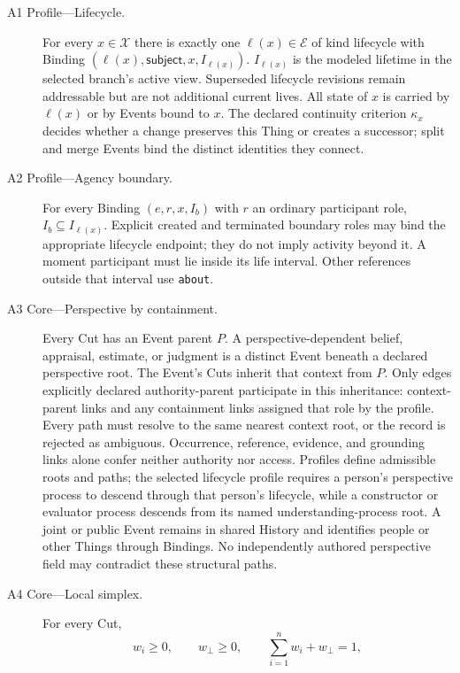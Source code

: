\documentclass[11pt,a4paper]{article}
\newcommand{\Xset}{\mathcal X}
\newcommand{\Eset}{\mathcal E}
\newcommand{\lc}{\ell}
\begin{document}
\begin{description}
  \item[A1 Profile---Lifecycle.] For every $x\in\Xset$ there is exactly one
    $\lc(x)\in\Eset$ of kind \textsf{lifecycle} with Binding
    $(\lc(x),\textsf{subject},x,I_{\lc(x)})$. $I_{\lc(x)}$ is the modeled
    lifetime in the selected branch's active view. Superseded lifecycle
    revisions remain addressable but are not additional current lives.
    All state of $x$ is carried by $\lc(x)$ or by Events bound to $x$.
    The declared continuity criterion $\kappa_x$ decides whether a change
    preserves this Thing or creates a successor; split and merge Events bind
    the distinct identities they connect.
  \item[A2 Profile---Agency boundary.] For every Binding $(e,r,x,I_b)$ with $r$ an
    ordinary participant role, $I_b\subseteq I_{\lc(x)}$.
    Explicit \textsf{created} and \textsf{terminated} boundary roles may bind
    the appropriate lifecycle endpoint; they do not imply activity beyond
    it. A moment participant must lie inside its life interval. Other
    references outside that interval use \texttt{about}.
  \item[A3 Core---Perspective by containment.] Every Cut has an Event parent
    $P$. A perspective-dependent belief, appraisal, estimate, or judgment is a
    distinct Event beneath a declared perspective root. The Event's Cuts
    inherit that context from $P$. Only edges explicitly declared
    \textsf{authority-parent} participate in this inheritance: context-parent
    links and any containment links assigned that role by the profile.
    Every path must resolve to the same nearest context root, or the record
    is rejected as ambiguous. Occurrence, reference, evidence, and grounding
    links alone confer neither authority nor access. Profiles define
    admissible roots and paths;
    the selected lifecycle profile requires a person's perspective process to
    descend through that person's lifecycle, while a constructor or evaluator
    process descends from its named understanding-process root. A joint or
    public Event remains in shared History and identifies people or other
    Things through Bindings. No independently authored perspective field may
    contradict these structural paths.
  \item[A4 Core---Local simplex.] For every Cut,
    \begin{equation}
      w_i\ge 0,\qquad w_\bot\ge 0,\qquad \sum_{i=1}^{n} w_i+w_\bot=1,
    \end{equation}

\end{description}
\end{document}
